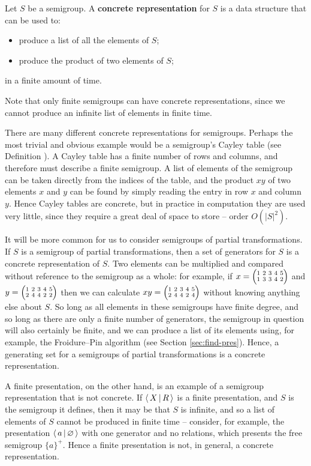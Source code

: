 \begin{definition}
  \label{def:concrete}
  Let $S$ be a semigroup.
  A \textbf{concrete representation} for $S$ is a data structure that can be
  used to:
  \begin{itemize}
  \item produce a list of all the elements of $S$;
  \item produce the product of two elements of $S$;
  \end{itemize}
  in a finite amount of time.
\end{definition}

Note that only finite semigroups can have concrete representations, since we
cannot produce an infinite list of elements in finite time.

There are many different concrete representations for semigroups.  Perhaps the
most trivial and obvious example would be a semigroup's Cayley table (see
Definition \label{def:cayley-table}).  A Cayley table has a finite number of
rows and columns, and therefore must describe a finite semigroup.  A list of
elements of the semigroup can be taken directly from the indices of the table,
and the product $xy$ of two elements $x$ and $y$ can be found by simply reading
the entry in row $x$ and column $y$.  Hence Cayley tables are concrete, but in
practice in computation they are used very little, since they require a great
deal of space to store -- order $O(|S|^2)$.

It will be more common for us to consider semigroups of partial transformations.
If $S$ is a semigroup of partial transformations, then a set of generators for
$S$ is a concrete representation of $S$.  Two elements can be multiplied and
compared without reference to the semigroup as a whole: for example, if
$x = \transV 13342$ and $y = \transV 24422$ then we can calculate
$xy = \transV 24424$ without knowing anything else about $S$.  So long as all
elements in these semigroups have finite degree, and so long as there are only a
finite number of generators, the semigroup in question will also certainly be
finite, and we can produce a list of its elements using, for example, the
Froidure--Pin algorithm (see Section \ref{sec:find-pres}).  Hence, a
generating set for a semigroups of partial transformations is a concrete
representation.

A finite presentation, on the other hand, is an example of a semigroup
representation that is not concrete.  If $\left\langle \, X \, \middle| \, R \, \right\rangle$ is a finite presentation,
and $S$ is the semigroup it defines, then it may be that $S$ is infinite, and so
a list of elements of $S$ cannot be produced in finite time -- consider, for
example, the presentation $\left\langle \, a \, \middle| \, \varnothing \, \right\rangle$ with one generator and no
relations, which presents the free semigroup $\{a\}^+$.  Hence a finite
presentation is not, in general, a concrete representation.

